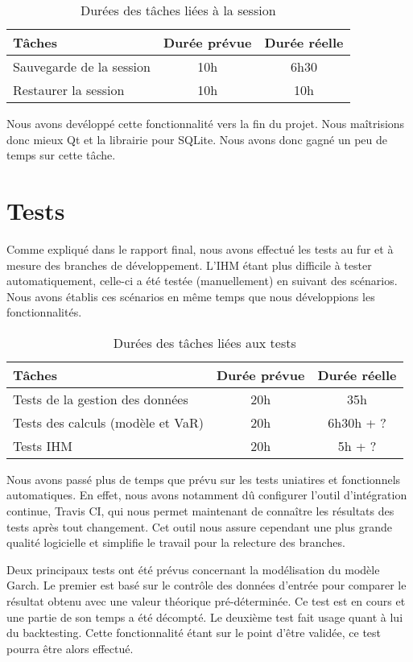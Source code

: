 \documentclass[a4paper]{report}
\begin{document}
\begin{table}[H]
\centering
  \begin{tabularx}{0.8\textwidth}{| X | c | c |}
    \hline
	Tâches & Durée prévue & Durée réelle \\
    \hline
    Sauvegarde de la session &  10h & 6h30\\
    Restaurer la session &  10h & 10h\\
    \hline
  \end{tabularx}
  \caption{Durées des tâches liées à la session}
\end{table}

Nous avons devéloppé cette fonctionnalité vers la fin du projet.
Nous maîtrisions donc mieux Qt et la librairie pour SQLite.
Nous avons donc gagné un peu de temps sur cette tâche.


\chapter{Tests}

Comme expliqué dans le rapport final, nous avons effectué les tests au fur et à mesure des branches de développement.
L'IHM étant plus difficile à tester automatiquement, celle-ci a été testée (manuellement) en suivant des scénarios.
Nous avons établis ces scénarios en même temps que nous développions les fonctionnalités.

\begin{table}[H]
\centering
  \begin{tabularx}{0.8\textwidth}{| X | c | c |}
    \hline
	Tâches & Durée prévue & Durée réelle \\
    \hline
    Tests de la gestion des données & 20h & 35h\\
    Tests des calculs (modèle et VaR) & 20h & 6h30h + ?\\
    Tests IHM & 20h & 5h + ?\\
    \hline
  \end{tabularx}
  \caption{Durées des tâches liées aux tests}
\end{table}

Nous avons passé plus de temps que prévu sur les tests uniatires et fonctionnels automatiques.
En effet, nous avons notamment dû configurer l'outil d'intégration continue, Travis CI, qui nous permet maintenant de connaître les résultats des tests après tout changement.
Cet outil nous assure cependant une plus grande qualité logicielle et simplifie le travail pour la relecture des branches.

Deux principaux tests ont été prévus concernant la modélisation du modèle Garch. Le premier est basé sur le contrôle des données d'entrée pour comparer le résultat obtenu avec une valeur théorique pré-déterminée. Ce test est en cours et une partie de son temps a été décompté. Le deuxième test fait usage quant à lui du backtesting. Cette fonctionnalité étant sur le point d'être validée, ce test pourra être alors effectué.
\end{document}
